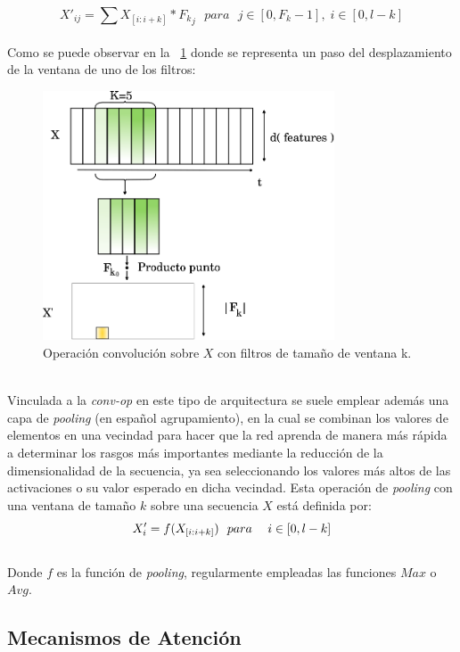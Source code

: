 	\begin{equation}
		X'_{ij} = \sum X_{[i:i+k]} * {F_k}_j ~~~ para ~~~ j \in [0, F_k-1], \;i \in [0, l-k]
	\end{equation}
	\\
	Como se puede observar en la \figurename~\ref{cnn} donde se representa un paso del desplazamiento de la ventana de uno de los filtros:
	\begin{figure}[!thb]
		\begin{center}
			\includegraphics[width=245pt]{images/cnn.eps}
		\end{center}
		\caption[Operación Convolución. CNN]{Operación convolución sobre $X$ con filtros de tamaño de ventana k. }
		\label{cnn}
	\end{figure}
	\\
	Vinculada a la \textit{conv-op} en este tipo de arquitectura se suele emplear además una capa de \textit{pooling} (en español agrupamiento), en la cual se combinan los valores de elementos en una vecindad para hacer que la red aprenda de manera más rápida a determinar los rasgos más importantes mediante la reducción de la dimensionalidad de la secuencia, ya sea seleccionando los valores más altos de las activaciones o su valor esperado en dicha vecindad. Esta operación de \textit{pooling} con una ventana de tamaño $k$  sobre una secuencia $X$ está definida por:
	\begin{equation}
		X'_i = f(X_{[i:i+k]}) ~~ para ~~~  \;i \in [0, l-k]
		\vspace{-5mm}
	\end{equation}
	\\
	Donde $f$ es la función de \textit{pooling}, regularmente empleadas las funciones $Max$ o $Avg$.
		
\subsection{Mecanismos de Atención}\label{atencion}

